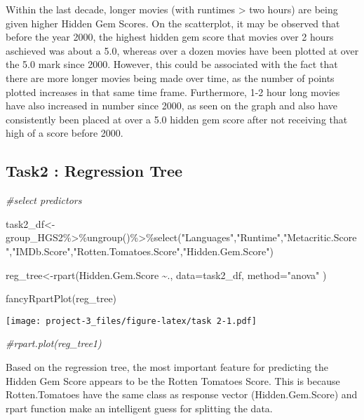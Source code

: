 \documentclass[
]{article}
\newenvironment{Shaded}{\begin{snugshade}}{\end{snugshade}}
\newcommand{\AttributeTok}[1]{\textcolor[rgb]{0.77,0.63,0.00}{#1}}
\newcommand{\CommentTok}[1]{\textcolor[rgb]{0.56,0.35,0.01}{\textit{#1}}}
\newcommand{\FunctionTok}[1]{\textcolor[rgb]{0.00,0.00,0.00}{#1}}
\newcommand{\NormalTok}[1]{#1}
\newcommand{\OtherTok}[1]{\textcolor[rgb]{0.56,0.35,0.01}{#1}}
\newcommand{\SpecialCharTok}[1]{\textcolor[rgb]{0.00,0.00,0.00}{#1}}
\newcommand{\StringTok}[1]{\textcolor[rgb]{0.31,0.60,0.02}{#1}}
\begin{document}
Within the last decade, longer movies (with runtimes \textgreater{} two
hours) are being given higher Hidden Gem Scores. On the scatterplot, it
may be observed that before the year 2000, the highest hidden gem score
that movies over 2 hours aschieved was about a 5.0, whereas over a dozen
movies have been plotted at over the 5.0 mark since 2000. However, this
could be associated with the fact that there are more longer movies
being made over time, as the number of points plotted increases in that
same time frame. Furthermore, 1-2 hour long movies have also increased
in number since 2000, as seen on the graph and also have consistently
been placed at over a 5.0 hidden gem score after not receiving that high
of a score before 2000.

\newpage

\hypertarget{task2-regression-tree}{%
\subsection{\texorpdfstring{\textbf{Task2} : Regression
Tree}{Task2 : Regression Tree}}\label{task2-regression-tree}}

\begin{Shaded}
\begin{Highlighting}[]
\CommentTok{\#select predictors }

\NormalTok{task2\_df}\OtherTok{\textless{}{-}}\NormalTok{group\_HGS2}\SpecialCharTok{\%\textgreater{}\%}\FunctionTok{ungroup}\NormalTok{()}\SpecialCharTok{\%\textgreater{}\%}\FunctionTok{select}\NormalTok{(}\StringTok{"Languages"}\NormalTok{,}\StringTok{"Runtime"}\NormalTok{,}\StringTok{"Metacritic.Score"}\NormalTok{,}\StringTok{"IMDb.Score"}\NormalTok{,}\StringTok{"Rotten.Tomatoes.Score"}\NormalTok{,}\StringTok{"Hidden.Gem.Score"}\NormalTok{)}

\NormalTok{reg\_tree}\OtherTok{\textless{}{-}}\FunctionTok{rpart}\NormalTok{(Hidden.Gem.Score }\SpecialCharTok{\textasciitilde{}}\NormalTok{.,}
                \AttributeTok{data=}\NormalTok{task2\_df,}
                \AttributeTok{method=}\StringTok{"anova"} 
\NormalTok{)}


\FunctionTok{fancyRpartPlot}\NormalTok{(reg\_tree)}
\end{Highlighting}
\end{Shaded}

\texttt{[image: project-3\_files/figure-latex/task 2-1.pdf]}

\begin{Shaded}
\begin{Highlighting}[]
\CommentTok{\#rpart.plot(reg\_tree1)}
\end{Highlighting}
\end{Shaded}

Based on the regression tree, the most important feature for predicting
the Hidden Gem Score appears to be the Rotten Tomatoes Score. This is
because Rotten.Tomatoes have the same class as response vector
(Hidden.Gem.Score) and rpart function make an intelligent guess for
splitting the data.

\newpage
\end{document}
